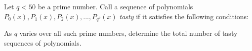 Let $q<50$ be a prime number. Call a sequence of polynomials $P_0(x), P_1(x), P_2(x), ..., P_{q^2}(x)$ \emph{tasty} if it satisfies the following conditions: 
\begin{itemize}
\end{itemize}
As $q$ varies over all such prime numbers, determine the total number of tasty sequences of polynomials.
